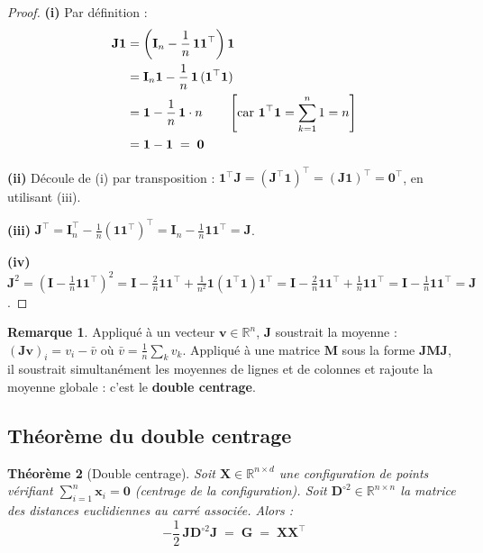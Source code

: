 \documentclass[12pt, a4paper]{article}
\theoremstyle{plain}
\newtheorem{theorem}{Théorème}[section]
\theoremstyle{definition}
\newtheorem{remark}[theorem]{Remarque}
\newcommand{\R}{\mathbb{R}}
\newcommand{\mat}[1]{\mathbf{#1}}
\newcommand{\vect}[1]{\mathbf{#1}}
\newcommand{\ones}{\mathbf{1}}
\newcommand{\Gram}{\mat{G}}
\newcommand{\Dsq}{\mat{D}^{\circ 2}}
\newcommand{\Jmat}{\mat{J}}
\begin{document}
\begin{proof}
    \textbf{(i)} Par définition :
    \begin{align}
        \Jmat\ones
        &= \left(\mat{I}_n - \frac{1}{n}\,\ones\ones^\top\right)\ones \notag\\
        &= \mat{I}_n\ones - \frac{1}{n}\,\ones\,(\ones^\top\ones) \notag\\
        &= \ones - \frac{1}{n}\,\ones\cdot n
        \qquad\left[\text{car } \ones^\top\ones
            = \sum_{k=1}^n 1 = n\right]\notag\\
        &= \ones - \ones \;=\; \vect{0}
    \end{align}

    \textbf{(ii)} Découle de (i) par transposition : $\ones^\top\Jmat =
    (\Jmat^\top\ones)^\top = (\Jmat\ones)^\top = \vect{0}^\top$, en utilisant
    (iii).

    \textbf{(iii)} $\Jmat^\top = \mat{I}_n^\top - \frac{1}{n}(\ones\ones^\top)^\top
    = \mat{I}_n - \frac{1}{n}\ones\ones^\top = \Jmat$.

    \textbf{(iv)}
    $\Jmat^2 = \left(\mat{I} - \frac{1}{n}\ones\ones^\top\right)^2
    = \mat{I} - \frac{2}{n}\ones\ones^\top
    + \frac{1}{n^2}\ones(\ones^\top\ones)\ones^\top
    = \mat{I} - \frac{2}{n}\ones\ones^\top + \frac{1}{n}\ones\ones^\top
    = \mat{I} - \frac{1}{n}\ones\ones^\top = \Jmat$.
\end{proof}

\begin{remark}
    Appliqué à un vecteur $\vect{v} \in \R^n$, $\Jmat$ soustrait la moyenne :
    $(\Jmat\vect{v})_i = v_i - \bar{v}$ où $\bar{v} = \frac{1}{n}\sum_k v_k$.
    Appliqué à une matrice $\mat{M}$ sous la forme $\Jmat\mat{M}\Jmat$, il
    soustrait simultanément les moyennes de lignes et de colonnes et rajoute
    la moyenne globale : c'est le \textbf{double centrage}.
\end{remark}

\subsection{Théorème du double centrage}

\begin{theorem}[Double centrage]\label{thm:double_centering}
    Soit $\mat{X} \in \R^{n\times d}$ une configuration de points vérifiant
    $\sum_{i=1}^n \vect{x}_i = \vect{0}$ (centrage de la configuration).
    Soit $\Dsq \in \R^{n\times n}$ la matrice des distances euclidiennes au
    carré associée. Alors :
    \begin{equation}
        \boxed{-\frac{1}{2}\,\Jmat\Dsq\Jmat \;=\; \Gram \;=\; \mat{X}\mat{X}^\top}
    \end{equation}
\end{theorem}
\end{document}
